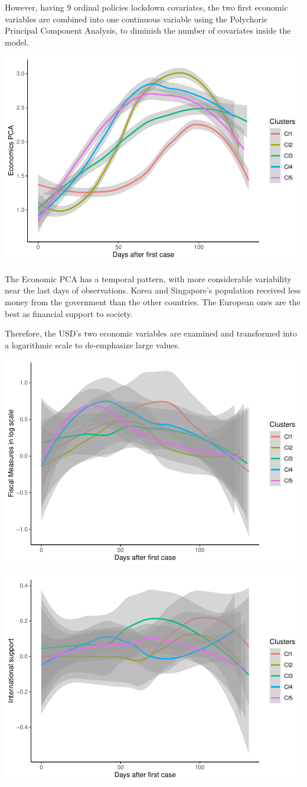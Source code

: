\documentclass[
  6pt,
]{article}
\begin{document}
However, having \(9\) ordinal policies lockdown covariates, the two
first economic variables are combined into one continuous variable using
the Polychoric Principal Component Analysis, to diminish the number of
covariates inside the model.
\begin{center}
\includegraphics[width=.7\textwidth]{Report_SC_Group3_files/figure-latex/unnamed-chunk-4-1.pdf}
\end{center}
The Economic PCA has a temporal pattern, with more considerable
variability near the last days of observations. Korea and Singapore's
population received less money from the government than the other
countries. The European ones are the best as financial support to
society.

Therefore, the USD's two economic variables are examined and transformed
into a logarithmic scale to de-emphasize large values.
\begin{center}
\includegraphics[width=.7\textwidth]{Report_SC_Group3_files/figure-latex/unnamed-chunk-5-1.pdf}

\includegraphics[width=.7\textwidth]{Report_SC_Group3_files/figure-latex/unnamed-chunk-6-1.pdf}
\end{center}
\end{document}
